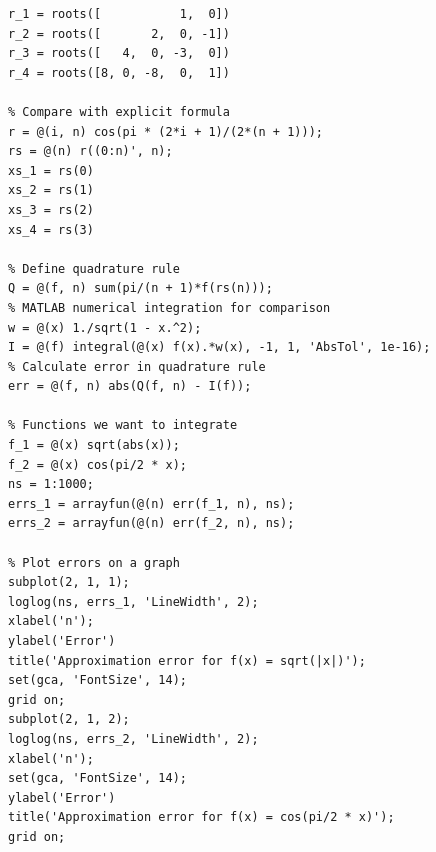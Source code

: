 \documentclass{article}
\begin{document}
\begin{Verbatim}[frame=single,
   label=\textsc{Matlab} code - main.m]
% Calculate numerically the roots of the polynomials p_n
r_1 = roots([           1,  0])
r_2 = roots([       2,  0, -1])
r_3 = roots([   4,  0, -3,  0])
r_4 = roots([8, 0, -8,  0,  1])

% Compare with explicit formula
r = @(i, n) cos(pi * (2*i + 1)/(2*(n + 1)));
rs = @(n) r((0:n)', n);
xs_1 = rs(0)
xs_2 = rs(1)
xs_3 = rs(2)
xs_4 = rs(3)

% Define quadrature rule
Q = @(f, n) sum(pi/(n + 1)*f(rs(n)));
% MATLAB numerical integration for comparison
w = @(x) 1./sqrt(1 - x.^2);
I = @(f) integral(@(x) f(x).*w(x), -1, 1, 'AbsTol', 1e-16);
% Calculate error in quadrature rule
err = @(f, n) abs(Q(f, n) - I(f));

% Functions we want to integrate
f_1 = @(x) sqrt(abs(x));
f_2 = @(x) cos(pi/2 * x);
ns = 1:1000;
errs_1 = arrayfun(@(n) err(f_1, n), ns);
errs_2 = arrayfun(@(n) err(f_2, n), ns);

% Plot errors on a graph
subplot(2, 1, 1);
loglog(ns, errs_1, 'LineWidth', 2);
xlabel('n');
ylabel('Error')
title('Approximation error for f(x) = sqrt(|x|)');
set(gca, 'FontSize', 14);
grid on;
subplot(2, 1, 2);
loglog(ns, errs_2, 'LineWidth', 2);
xlabel('n');
set(gca, 'FontSize', 14);
ylabel('Error')
title('Approximation error for f(x) = cos(pi/2 * x)');
grid on;
\end{Verbatim}
\end{document}
